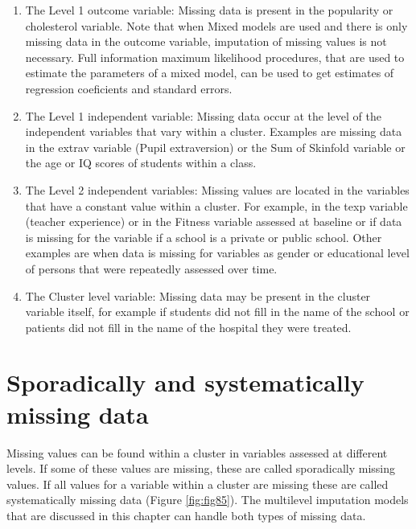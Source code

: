 \documentclass[
]{book}
\begin{document}
\begin{enumerate}
\def\labelenumi{\arabic{enumi})}
\item
  The Level 1 outcome variable:
  Missing data is present in the popularity or cholesterol variable. Note that when Mixed models are used and there is only missing data in the outcome variable, imputation of missing values is not necessary. Full information maximum likelihood procedures, that are used to estimate the parameters of a mixed model, can be used to get estimates of regression coeficients and standard errors.
\item
  The Level 1 independent variable:
  Missing data occur at the level of the independent variables that vary within a cluster. Examples are missing data in the extrav variable (Pupil extraversion) or the Sum of Skinfold variable or the age or IQ scores of students within a class.
\item
  The Level 2 independent variables:
  Missing values are located in the variables that have a constant value within a cluster. For example, in the texp variable (teacher experience) or in the Fitness variable assessed at baseline or if data is missing for the variable if a school is a private or public school. Other examples are when data is missing for variables as gender or educational level of persons that were repeatedly assessed over time.
\item
  The Cluster level variable:
  Missing data may be present in the cluster variable itself, for example if students did not fill in the name of the school or patients did not fill in the name of the hospital they were treated.
\end{enumerate}

\hypertarget{sporadically-and-systematically-missing-data}{%
\section{Sporadically and systematically missing data}\label{sporadically-and-systematically-missing-data}}

Missing values can be found within a cluster in variables assessed at different levels. If some of these values are missing, these are called sporadically missing values. If all values for a variable within a cluster are missing these are called systematically missing data (Figure \ref{fig:fig85}). The multilevel imputation models that are discussed in this chapter can handle both types of missing data.
\end{document}
